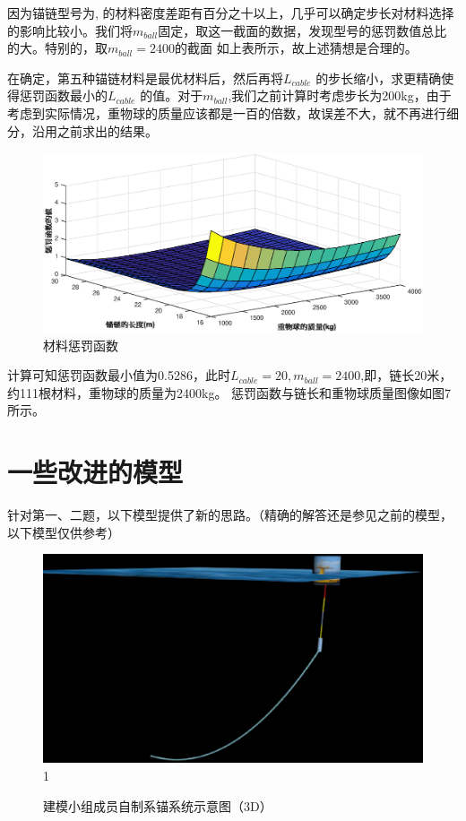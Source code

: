 \documentclass[a4paper,12pt]{ctexart}
\begin{document}
因为锚链型号为\uppercase\expandafter{},\uppercase\expandafter{} 的材料密度差距有百分之十以上，几乎可以确定步长对材料选择的影响比较小。我们将$m_{ball}$固定，取这一截面的数据，发现型号\uppercase\expandafter{}的惩罚数值总比\uppercase\expandafter{}的大。特别的，取$m_{ball}=2400$的截面 如上表所示，故上述猜想是合理的。

在确定，第五种锚链材料是最优材料后，然后再将$L_{cable}$ 的步长缩小，求更精确使得惩罚函数最小的$L_{cable}$ 的值。对于$m_{ball}$,我们之前计算时考虑步长为200kg，由于考虑到实际情况，重物球的质量应该都是一百的倍数，故误差不大，就不再进行细分，沿用之前求出的结果。

\begin{figure}
  \centering
  \includegraphics[scale=0.6]{question3_1.eps}
  \caption{材料\uppercase\expandafter{}惩罚函数}\label{}
\end{figure}

计算可知惩罚函数最小值为0.5286，此时$L_{cable}=20,m_{ball}=2400$,即，链长20米，约111根材料\uppercase\expandafter{}，重物球的质量为2400kg。 惩罚函数与链长和重物球质量图像如图7所示。



\section{一些改进的模型}

针对第一、二题，以下模型提供了新的思路。（精确的解答还是参见之前的模型，以下模型仅供参考）\\
\begin{figure}[H]
\centering
\includegraphics[width=400pt]{system.eps}1
\caption{建模小组成员自制系锚系统示意图（3D）}
\end{figure}
\end{document}
